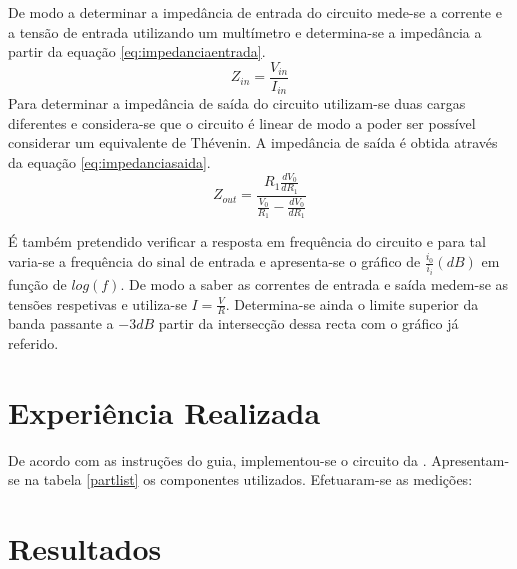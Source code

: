 \documentclass[%
  reprint,
  nofootinbib,
  amsmath,amssymb,
  aps,
  10pt,
  a4paper
]{revtex4-1}
\begin{document}
De modo a determinar a impedância de entrada do circuito mede-se a corrente e a tensão de entrada utilizando um multímetro e determina-se a impedância a partir da equação \ref{eq:impedanciaentrada}.
\begin{equation}
Z_{in}=\frac{V_{in}}{I_{in}}
\label{eq:impedanciaentrada}
\end{equation}
Para determinar a impedância de saída do circuito utilizam-se duas cargas diferentes e considera-se que o circuito é linear de modo a poder ser possível considerar um equivalente de Thévenin. A impedância de saída é obtida através da equação \ref{eq:impedanciasaida}.
\begin{equation}
Z_{out}=\frac{R_1 \frac{dV_0}{dR_1}}{\frac{V_0}{R_1}-\frac{dV_0}{dR_1}}
\label{eq:impedanciasaida}
\end{equation}

É também pretendido verificar a resposta em frequência do circuito e para tal varia-se a frequência do sinal de entrada e apresenta-se o gráfico de $\frac{i_0}{i_i} (dB)$ em função de $log(f)$. De modo a saber as correntes de entrada e saída medem-se as tensões respetivas e utiliza-se $I=\frac{V}{R}$. Determina-se ainda o limite superior da banda passante a $-3dB$ partir da intersecção dessa recta com o gráfico já referido. 

\section{Experiência Realizada}
\label{s:expreal}
De acordo com as instruções do guia, implementou-se o circuito da . Apresentam-se na tabela \ref{partlist} os componentes utilizados.
Efetuaram-se as medições:




\section{Resultados}
\label{s:resul}
\end{document}
